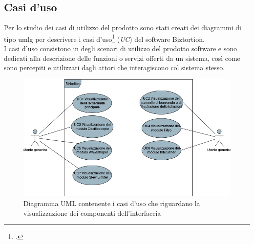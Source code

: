 \subsection{Casi d'uso}

Per lo studio dei casi di utilizzo del prodotto sono stati creati dei diagrammi di tipo \gls{umlg} per descrivere i casi d'uso\footcite{site:UseCase} (\textit{UC}) del software Biztortion. \\
I casi d'uso consistono in degli scenari di utilizzo del prodotto software e sono dedicati alla descrizione delle funzioni o servizi offerti da un sistema, così come sono percepiti e utilizzati dagli attori che interagiscono col sistema stesso. \\

\begin{figure}[h!] 
    \centering 
    \includegraphics[width=0.9\columnwidth]{immagini/cap3/VisualizzazioneGenerale.png}
    \caption{Diagramma UML contenente i casi d'uso che riguardano la visualizzazione dei componenti dell'interfaccia}
\end{figure}



